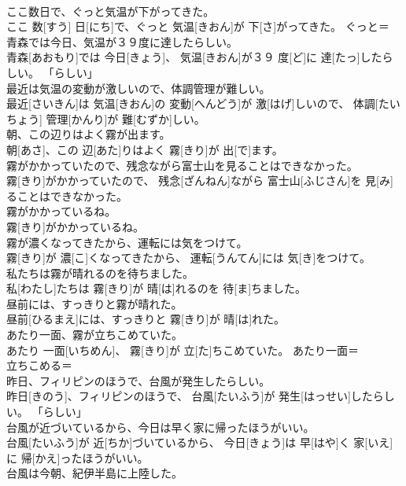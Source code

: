 \documentclass[8pt]{extreport}
\begin{document}
\begin{CJK}{UTF8}{min}
\\	ここ数日で、ぐっと気温が下がってきた。	
\\	ここ 数[すう] 日[にち]で、ぐっと 気温[きおん]が 下[さ]がってきた。	ぐっと＝ 
\\	青森では今日、気温が３９度に達したらしい。	
\\	青森[あおもり]では 今日[きょう]、 気温[きおん]が３９ 度[ど]に 達[たっ]したらしい。	「らしい」
\\	最近は気温の変動が激しいので、体調管理が難しい。	
\\	最近[さいきん]は 気温[きおん]の 変動[へんどう]が 激[はげ]しいので、 体調[たいちょう] 管理[かんり]が 難[むずか]しい。	
\\	朝、この辺りはよく霧が出ます。	
\\	朝[あさ]、この 辺[あた]りはよく 霧[きり]が 出[で]ます。	
\\	霧がかかっていたので、残念ながら富士山を見ることはできなかった。	
\\	霧[きり]がかかっていたので、 残念[ざんねん]ながら 富士山[ふじさん]を 見[み]ることはできなかった。	
\\	霧がかかっているね。	
\\	霧[きり]がかかっているね。	
\\	霧が濃くなってきたから、運転には気をつけて。	
\\	霧[きり]が 濃[こ]くなってきたから、 運転[うんてん]には 気[き]をつけて。	
\\	私たちは霧が晴れるのを待ちました。	
\\	私[わたし]たちは 霧[きり]が 晴[は]れるのを 待[ま]ちました。	
\\	昼前には、すっきりと霧が晴れた。	
\\	昼前[ひるまえ]には、すっきりと 霧[きり]が 晴[は]れた。	
\\	あたり一面、霧が立ちこめていた。	
\\	あたり 一面[いちめん]、 霧[きり]が 立[た]ちこめていた。	あたり一面＝ 
\\	立ちこめる＝ 
\\	昨日、フィリピンのほうで、台風が発生したらしい。	
\\	昨日[きのう]、フィリピンのほうで、 台風[たいふう]が 発生[はっせい]したらしい。	「らしい」
\\	台風が近づいているから、今日は早く家に帰ったほうがいい。	
\\	台風[たいふう]が 近[ちか]づいているから、 今日[きょう]は 早[はや]く 家[いえ]に 帰[かえ]ったほうがいい。	
\\	台風は今朝、紀伊半島に上陸した。	

\end{CJK}
\end{document}
